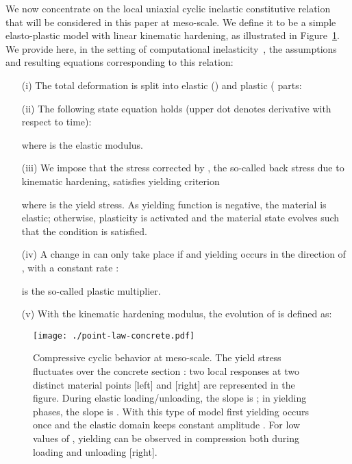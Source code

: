 \documentclass[12p]{amsart}
\begin{document}
We now concentrate on the local uniaxial cyclic inelastic constitutive relation that will be considered in this paper at meso-scale. We define it to be a simple elasto-plastic model with linear kinematic hardening, as illustrated in Figure~\ref{fig:point-law-concrete}. We provide here, in the setting of computational inelasticity~\cite{SimHug1998, Ibrahimbegovic2009}, the assumptions and resulting equations corresponding to this relation:
\begin{itemize}
 \item[(i)] The total deformation  is split into elastic () and plastic ( parts:
 
 \item[(ii)] The following state equation holds (upper dot denotes derivative with respect to time):
 
where  is the elastic modulus.
\item[(iii)] We impose that the stress  corrected by , the so-called back stress due to kinematic hardening, satisfies yielding criterion

where  is the yield stress. As yielding function  is negative, the material is elastic; otherwise, plasticity is activated and the material state evolves such that the condition  is satisfied.
 \item[(iv)] A change in  can only take place if  and yielding occurs in the direction of , with a constant rate :
 
  is the so-called plastic multiplier.
 \item[(v)] With  the kinematic hardening modulus, the evolution of  is defined as:
  
\end{itemize}

\begin{figure}[htb]
\begin{center}
\texttt{[image: ./point-law-concrete.pdf]}
\caption{Compressive cyclic behavior at meso-scale. The yield stress  fluctuates over the concrete section : two local responses at two distinct material points  [left] and  [right] are represented in the figure. During elastic loading/unloading, the slope is ; in yielding phases, the slope is . With this type of model first yielding occurs once  and the elastic domain keeps constant amplitude . For low values of , yielding can be observed in compression both during loading and unloading [right].}
\label{fig:point-law-concrete}
\end{center}
\end{figure}
\end{document}
